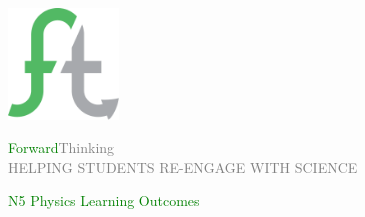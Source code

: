 \documentclass[12pt, a4paper, landscape, dvipsnames]{report}
\begin{document}

\begin{titlepage}
	\begin{center}
		\vspace*{3cm}
		\includegraphics[width=0.22\textwidth]{ftlogo} \\
		\vspace*{1cm}
        \begin{centering}
            {\fontsize{1.5cm}{1cm}\selectfont
            \textcolor{Green}{Forward}\textcolor{Gray}{Thinking}
            }\\
            \vspace*{0.5cm}
            {\fontsize{.5cm}{1cm}\selectfont
            \textcolor{Gray}{HELPING STUDENTS RE-ENGAGE WITH SCIENCE}
            }\\
        \end{centering}
		\vspace*{2cm}
        \begin{centering}
            {\fontsize{1.5cm}{1cm}\selectfont
            \textcolor{Green}{N5 Physics Learning Outcomes}
            }
        \end{centering}
	\end{center}
\end{titlepage}


\raggedright






\end{document}

